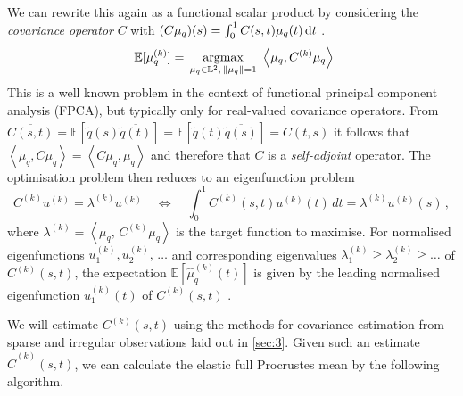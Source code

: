 We can rewrite this again as a functional scalar product by considering the \emph{covariance operator} $C$ with $(C\mu_q)(s) = \int_0^1 C(s,t) \mu_q(t) \mathop{\mathrm{d}t}$ \parencite[see][153]{RamsaySilverman2005}.
\begin{equation}\
  \label{eq:quadr_opt}
  \mathbb{E}[\mu_q^{(k)}] = \, \operatorname*{argmax}_{\mu_q \in \mathbb{L}^2,\,\lVert\mu_q\rVert = 1}\,\,
    \left\langle \mu_q, C^{(k)}\mu_q \right\rangle
\end{equation}
This is a well known problem in the context of functional principal component analysis (FPCA), but typically only for real-valued covariance operators.
From $\overline{C(s,t)} = \overline{\mathbb{E}[\widetilde q(s)\overline{\widetilde q(t)}]} = \mathbb{E}[\widetilde q(t)\overline{\widetilde q(s)}] = C(t,s)$ it follows that $\left\langle \mu_q, C \mu_q \right\rangle = \left\langle C \mu_q, \mu_q \right\rangle$ and therefore that $C$ is a \emph{self-adjoint} operator.
The optimisation problem then reduces to an eigenfunction problem 
\begin{equation}
  \label{eq:funceig}
  C^{(k)} u^{(k)} = \lambda^{(k)} u^{(k)} \quad \Leftrightarrow \quad \int_0^1 C^{(k)}(s, t) u^{(k)}(t)\, dt = \lambda^{(k)} u^{(k)}(s)\,,
\end{equation}
where $\lambda^{(k)} = \left\langle \mu_q,\, C^{(k)} \mu_q \right\rangle$ is the target function to maximise.
For normalised eigenfunctions $u^{(k)}_1, u^{(k)}_2,\,\dots$ and corresponding eigenvalues $\lambda^{(k)}_1 \geq \lambda^{(k)}_2 \geq \dots$ of $C^{(k)}(s,t)$, the expectation $\mathbb{E}[\hat\mu_q^{(k)}(t)]$ is given by the leading normalised eigenfunction $u^{(k)}_1(t)$ of $C^{(k)}(s,t)$ \parencite[see][153,397]{RamsaySilverman2005}.

We will estimate $C^{(k)}(s,t)$ using the methods for covariance estimation from sparse and irregular observations laid out in \cref{sec:3}.
Given such an estimate $\hat C^{(k)}(s,t)$, we can calculate the elastic full Procrustes mean by the following algorithm.

